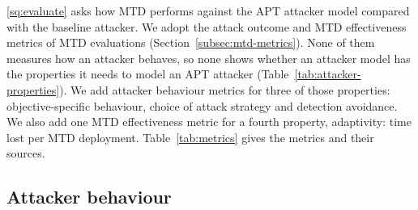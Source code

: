 \documentclass{cshonours}
\begin{document}
\ref{sq:evaluate} asks how MTD performs against the APT attacker model compared
with the baseline attacker. We adopt the attack outcome and MTD effectiveness
metrics of MTD evaluations (Section~\ref{subsec:mtd-metrics}). None of them
measures how an attacker behaves, so none shows whether an attacker model has
the properties it needs to model an APT attacker
(Table~\ref{tab:attacker-properties}). We add attacker behaviour metrics for
three of those properties: objective-specific behaviour, choice of attack strategy and detection avoidance. We also add one MTD effectiveness metric for a fourth property,
adaptivity: time lost per MTD deployment. Table~\ref{tab:metrics} gives the metrics and their sources.



\subsection{Attacker behaviour}
\label{subsec:metrics-behaviour}
\end{document}
